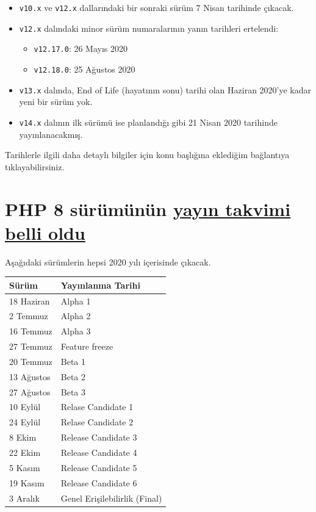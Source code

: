 \documentclass[11pt]{article}
\begin{document}
\begin{itemize}
\item \texttt{v10.x} ve \texttt{v12.x} dallarındaki bir sonraki sürüm 7 Nisan tarihinde çıkacak.
\item \texttt{v12.x} dalındaki minor sürüm numaralarının yanın tarihleri ertelendi:
\begin{itemize}
\item \texttt{v12.17.0}: 26 Mayıs 2020
\item \texttt{v12.18.0}: 25 Ağustos 2020
\end{itemize}
\item \texttt{v13.x} dalında, End of Life (hayatının sonu) tarihi olan Haziran 2020'ye
kadar yeni bir sürüm yok.
\item \texttt{v14.x} dalının ilk sürümü ise planlandığı gibi 21 Nisan 2020 tarihinde
yayınlanacakmış.
\end{itemize}

Tarihlerle ilgili daha detaylı bilgiler için konu başlığına eklediğim
bağlantıya tıklayabilirsiniz.
\section{PHP 8 sürümünün \href{https://wiki.php.net/todo/php80}{yayın takvimi belli oldu}}
\label{sec:orgb93c4b4}
Aşağıdaki sürümlerin hepsi 2020 yılı içerisinde çıkacak.

\begin{center}
\begin{tabular}{ll}
Sürüm & Yayınlanma Tarihi\\
\hline
18 Haziran & Alpha 1\\
2 Temmuz & Alpha 2\\
16 Temmuz & Alpha 3\\
27 Temmuz & Feature freeze\\
20 Temmuz & Beta 1\\
13 Ağustos & Beta 2\\
27 Ağustos & Beta 3\\
10 Eylül & Relase Candidate 1\\
24 Eylül & Relase Candidate 2\\
8 Ekim & Release Candidate 3\\
22 Ekim & Release Candidate 4\\
5 Kasım & Release Candidate 5\\
19 Kasım & Release Candidate 6\\
3 Aralık & Genel Erişilebilirlik (Final)\\
\end{tabular}
\end{center}
\end{document}

